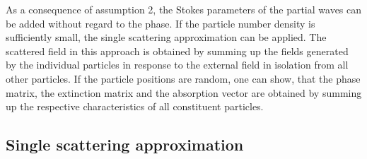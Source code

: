As a consequence of assumption 2, the Stokes parameters of the partial
waves can be added without regard to the phase. If the particle number
density is sufficiently small, the single scattering approximation can
be applied. The scattered field in this approach is obtained by
summing up the fields generated by the individual particles in
response to the external field in isolation from all other particles.
If the particle positions are random, one can show, that the phase
matrix, the extinction matrix and the absorption vector are obtained
by summing up the respective characteristics of all constituent
particles.

\subsection{Single scattering approximation}

